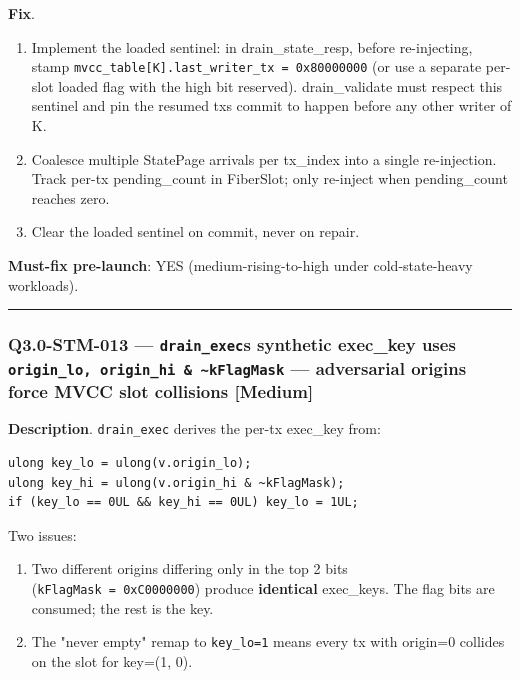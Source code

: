 \documentclass[
]{article}
\providecommand{\tightlist}{%
  \setlength{\itemsep}{0pt}\setlength{\parskip}{0pt}}
\begin{document}
\textbf{Fix}.

\begin{enumerate}
\def\labelenumi{\arabic{enumi}.}
\tightlist
\item
  Implement the loaded sentinel: in drain\_state\_resp, before
  re-injecting, stamp
  \texttt{mvcc\_table{[}K{]}.last\_writer\_tx\ \textbar{}=\ 0x80000000}
  (or use a separate per-slot loaded flag with the high bit reserved).
  drain\_validate must respect this sentinel and pin the resumed
  tx\textquotesingle s commit to happen before any other writer of K.
\item
  Coalesce multiple StatePage arrivals per tx\_index into a single
  re-injection. Track per-tx pending\_count in FiberSlot; only re-inject
  when pending\_count reaches zero.
\item
  Clear the loaded sentinel on commit, never on repair.
\end{enumerate}

\textbf{Must-fix pre-launch}: YES (medium-rising-to-high under
cold-state-heavy workloads).

\begin{center}\rule{0.5\linewidth}{0.5pt}\end{center}

\subsubsection{\texorpdfstring{Q3.0-STM-013 ---
\texttt{drain\_exec}\textquotesingle s synthetic exec\_key uses
\texttt{origin\_lo,\ origin\_hi\ \&\ \textasciitilde{}kFlagMask} ---
adversarial origins force MVCC slot collisions
{[}Medium{]}}{Q3.0-STM-013 --- drain\_exec\textquotesingle s synthetic exec\_key uses origin\_lo, origin\_hi \& \textasciitilde kFlagMask --- adversarial origins force MVCC slot collisions {[}Medium{]}}}\label{q30-stm-013--drain_execs-synthetic-exec_key-uses-origin_lo-origin_hi--kflagmask--adversarial-origins-force-mvcc-slot-collisions-medium}

\textbf{Description}. \texttt{drain\_exec} derives the per-tx exec\_key
from:

\begin{verbatim}
ulong key_lo = ulong(v.origin_lo);
ulong key_hi = ulong(v.origin_hi & ~kFlagMask);
if (key_lo == 0UL && key_hi == 0UL) key_lo = 1UL;
\end{verbatim}

Two issues:

\begin{enumerate}
\def\labelenumi{\arabic{enumi}.}
\tightlist
\item
  Two different origins differing only in the top 2 bits
  (\texttt{kFlagMask\ =\ 0xC0000000}) produce \textbf{identical}
  exec\_keys. The flag bits are consumed; the rest is the key.
\item
  The "never empty" remap to \texttt{key\_lo=1} means every tx with
  origin=0 collides on the slot for key=(1, 0).
\end{enumerate}
\end{document}
